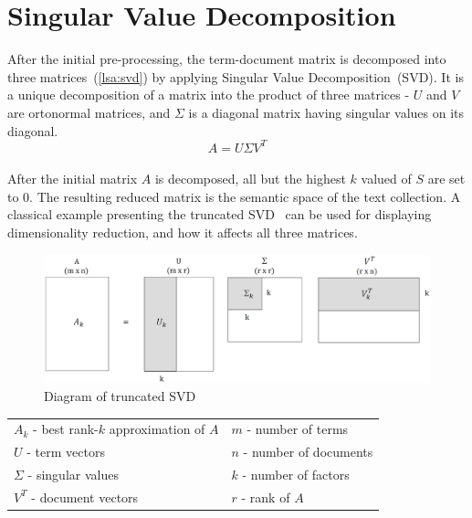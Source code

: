 \section{Singular Value Decomposition}
\label{sec:lsa:svd}

After the initial pre-processing, the term-document matrix is decomposed into three matrices~(\ref{lsa:svd}) by applying Singular Value Decomposition~(\gls{SVD}). It is a unique decomposition of a matrix into the product of three matrices - $U$ and $V$ are ortonormal matrices, and $ \Sigma $ is a diagonal matrix having singular values on its diagonal.\\
%
%
\begin{equation}
\label{lsa:svd}
A=U \Sigma V^{T}
\end{equation}\\

After the initial matrix $A$ is decomposed, all but the highest $k$ valued of $S$ are set to $0$. The resulting reduced matrix is the semantic space of the text collection. A classical example presenting the truncated \gls{SVD}~\cite{Dumais88usingLSA}  can be used for displaying dimensionality reduction, and how it affects all three matrices.\\
%
%
\begin{center}
\begin{figure}[htbp]
\label{lsa:truncated_svd}
	\centering
	\includegraphics[width=\ScaleIfNeeded]{img/svd} 
	\caption[Diagram of truncated SVD]%
           {Diagram of truncated SVD}
\end{figure}
%
%
\begin{tabular}{l l}
$A_{k}$ - best rank-$k$ approximation of $A$ & $m$ - number of terms\\
$U$ - term vectors & $n$ - number of documents \\
$\Sigma$ - singular values & $k$ - number of factors \\
$V^{T}$ - document vectors & $r$ - rank of $A$ \\
\end{tabular}
\end{center} 

